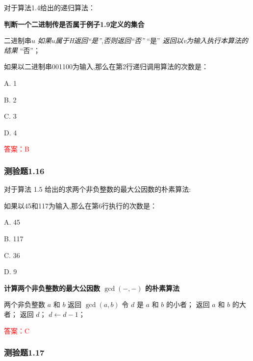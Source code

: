 \documentclass[UTF8, heading=true]{ctexart}
\begin{document}
对于算法1.4给出的递归算法：

\begin{algorithm}
    \caption{\textbf{判断一个二进制传是否属于例子1.9定义的集合}}
    \begin{algorithmic}[1]
        \Require 二进制串$u$
        \Ensure \textit{如果$u$属于H返回“是”,否则返回“否”}
        \State \Return “是”
        \EndIf
        \State \textit{返回以v为输入执行本算法的结果}
        \Else 
        \State \Return “否”；
        \EndIf
    \end{algorithmic}
\end{algorithm}

如果以二进制串001100为输入,那么在第2行递归调用算法的次数是：

A. 1

B. 2

C. 3

D. 4

\textcolor{red}{答案：B}

\subsubsection{测验题1.16}

对于算法 1.5 给出的求两个非负整数的最大公因数的朴素算法:


如果以45和117为输入,那么在第6行执行的次数是：

A. 45

B. 117

C. 36

D. 9


\begin{algorithm}
  \caption{\textbf{计算两个非负整数的最大公因数 $\operatorname{gcd}(-,-)$ 的朴素算法}}
  \begin{algorithmic}[1]
    \Require 两个非负整数 $a$ 和 $b$
    \Ensure 返回 $\operatorname{gcd}(a, b)$
    \State 令 $d$ 是 $a$ 和 $b$ 的小者；
    \State 返回 $a$ 和 $b$ 的大者；
    \EndIf
    \State 返回 $d$；
    \EndIf
    \State $d \gets d-1$；
    \EndWhile
  \end{algorithmic}
\end{algorithm}

\textcolor{red}{答案：C}

\subsubsection{测验题1.17}
\end{document}
